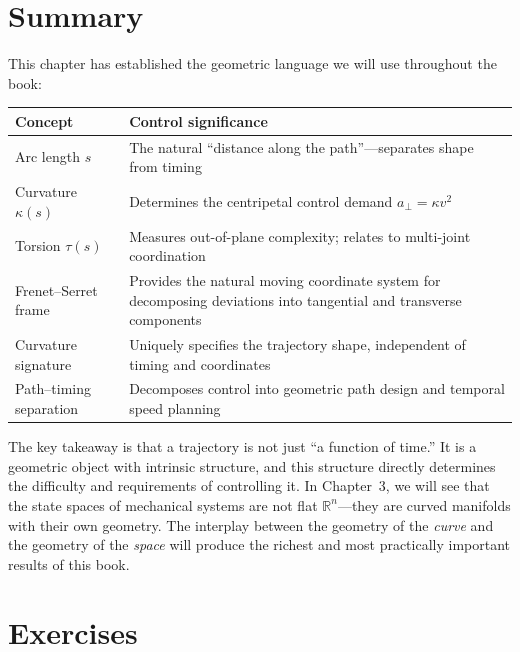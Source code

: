 \documentclass[12pt, openany]{book}
\theoremstyle{plain}
\newcommand{\Reals}{\mathbb{R}}
\begin{document}
\section{Summary}

This chapter has established the geometric language we will use throughout the
book:

\begin{center}
\renewcommand{\arraystretch}{1.4}
\begin{tabular}{@{} l p{9cm} @{}}
  \toprule
  \textbf{Concept} & \textbf{Control significance} \\
  \midrule
  Arc length $s$ & The natural ``distance along the path''---separates shape
    from timing \\
  Curvature $\kappa(s)$ & Determines the centripetal control demand
    $a_\perp = \kappa v^2$ \\
  Torsion $\tau(s)$ & Measures out-of-plane complexity; relates to
    multi-joint coordination \\
  Frenet--Serret frame & Provides the natural moving coordinate system for
    decomposing deviations into tangential and transverse components \\
  Curvature signature & Uniquely specifies the trajectory shape, independent
    of timing and coordinates \\
  Path--timing separation & Decomposes control into geometric path design and
    temporal speed planning \\
  \bottomrule
\end{tabular}
\end{center}

\vspace{0.5cm}

The key takeaway is that a trajectory is not just ``a function of time.'' It is a
geometric object with intrinsic structure, and this structure directly determines
the difficulty and requirements of controlling it. In Chapter~3, we will see that
the state spaces of mechanical systems are not flat $\Reals^n$---they are curved
manifolds with their own geometry. The interplay between the geometry of the
\emph{curve} and the geometry of the \emph{space} will produce the richest and
most practically important results of this book.

\section{Exercises}
\end{document}
